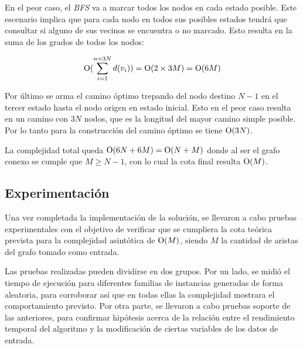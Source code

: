 	En el peor caso, el \emph{BFS} va a marcar todos los nodos en cada estado
	posible. Este escenario implica que para cada nodo en todos sus posibles
	estados tendrá que consultar si alguno de sus vecinos se encuentra o no
	marcado. Esto resulta en la suma de los grados de todos los nodos:

	\begin{equation*}
		\operatorname{O}(\sum_{i=1}^{n=3 N} d(v_i)) = \operatorname{O}(2 \times 3M) = \operatorname{O}(6M)
	\end{equation*}

	Por último se arma el camino óptimo trepando del nodo destino $N - 1$ en el
	tercer estado hasta el nodo origen en estado inicial. Esto en el peor caso
	resulta en un camino con $3N$ nodos, que es la longitud del mayor camino
	simple posible. Por lo tanto para la construcción del camino óptimo se
	tiene $\operatorname{O}(3N)$.

	La complejidad total queda $\operatorname{O}(6N + 6M) = \operatorname{O}(N + M)$ donde al ser el
	grafo conexo se cumple que $M \geq N - 1$, con lo cual la cota final resulta $\operatorname{O}(M)$.

    \subsection{Experimentación}

    Una vez completada la implementación de la solución, se llevaron a cabo
    pruebas experimentales con el objetivo de verificar que se cumpliera la
    cota teórica prevista para la complejidad asintótica de $\operatorname{O}(M)$, siendo
    $M$ la cantidad de aristas del grafo tomado como entrada.

    Las pruebas realizadas pueden dividirse en dos grupos. Por un lado, se
    midió el tiempo de ejecución para diferentes familias de instancias
    generadas de forma aleatoria, para corroborar así que en todas ellas la
    complejidad mostrara el comportamiento previsto. Por otra parte, se
    llevaron a cabo pruebas soporte de las anteriores, para confirmar
    hipótesis acerca de la relación entre el rendimiento temporal del
    algoritmo y la modificación de ciertas variables de los datos de entrada.

